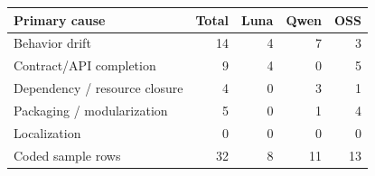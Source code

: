 \begin{tabular}{lrrrr}
\toprule
\textbf{Primary cause} & \textbf{Total} & \textbf{Luna} & \textbf{Qwen} & \textbf{OSS} \\
\midrule
Behavior drift & 14 & 4 & 7 & 3 \\
Contract/API completion & 9 & 4 & 0 & 5 \\
Dependency / resource closure & 4 & 0 & 3 & 1 \\
Packaging / modularization & 5 & 0 & 1 & 4 \\
Localization & 0 & 0 & 0 & 0 \\
\midrule
Coded sample rows & 32 & 8 & 11 & 13 \\
\bottomrule
\end{tabular}
